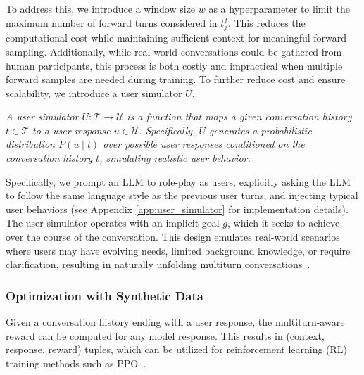 To address this, we introduce a window size $w$ as a hyperparameter to limit the maximum number of forward turns considered in $t_j^f$. This reduces the computational cost while maintaining sufficient context for meaningful forward sampling. Additionally, while real-world conversations could be gathered from human participants, this process is both costly and impractical when multiple forward samples are needed during training. To further reduce cost and ensure scalability, we introduce a user simulator $U$.

\textit{A user simulator $U: \mathcal{T} \rightarrow \mathcal{U}$ is a function that maps a given conversation history $t \in \mathcal{T}$ to a user response $u \in \mathcal{U}$. Specifically, $U$ generates a probabilistic distribution $P(u \mid t)$ over possible user responses conditioned on the conversation history $t$, simulating realistic user behavior. }

Specifically, we prompt an LLM to role-play as users,  explicitly asking the LLM to follow the same language style as the previous user turns, and injecting typical user behaviors (see Appendix \ref{app:user_simulator} for implementation details). The user simulator operates with an implicit goal $g$, which it seeks to achieve over the course of the conversation. This design emulates real-world scenarios where users may have evolving needs, limited background knowledge, or require clarification, resulting in naturally unfolding multiturn conversations~\citep{simulate1000}.

\subsubsection{Optimization with Synthetic Data}
\label{sec:optimization}
Given a conversation history ending with a user response, the multiturn-aware reward can be computed for any model response. This results in (context, response, reward) tuples, which can be utilized for reinforcement learning (RL) training methods such as PPO~\citep{ppo}. 

